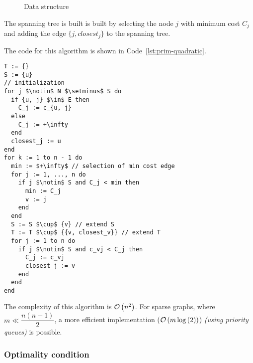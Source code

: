 \documentclass[english]{article}
\begin{document}
\begin{figure}[htbp]
  \centering
  \bigskip
  \centering
  \caption{Data structure}
  \label{fig:prim-quadratic-data-structure}
  \bigskip
\end{figure}

The spanning tree is built is built by selecting the node \(j\) with minimum cost \(C_j\) and adding the edge \(\{j, \textit{closest}_j\}\) to the spanning tree.

\bigskip
The code for this algorithm is shown in Code~\ref{lst:prim-quadratic}.

\begin{lstlisting}[style=custom, language=pseudocode, caption={Prim's algorithm in quadratic time}, label={lst:prim-quadratic}]
T := {}
S := {u}
// initialization
for j $\notin$ N $\setminus$ S do
  if {u, j} $\in$ E then
    C_j := c_{u, j}
  else
    C_j := +\infty
  end
  closest_j := u
end
for k := 1 to n - 1 do
  min := $+\infty$ // selection of min cost edge
  for j := 1, ..., n do
    if j $\notin$ S and C_j < min then
      min := C_j
      v := j
    end
  end
  S := S $\cup$ {v} // extend S
  T := T $\cup$ {{v, closest_v}} // extend T
  for j := 1 to n do
    if j $\notin$ S and c_vj < C_j then
      C_j := c_vj
      closest_j := v
    end
  end
end
\end{lstlisting}

\bigskip
The complexity of this algorithm is \(\mathcal{O}\left(n^2\right)\).
For sparse graphs, where \(m \ll \dfrac{n(n-1)}{2}\), a more efficient implementation (\(\mathcal{O}\left(m \log{(2)}\right)\)) \textit{(using priority queues)} is possible.

\subsubsection{Optimality condition}
\end{document}

